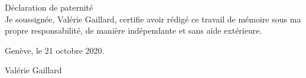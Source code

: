 
\begin{titlepage}
 \begin{center}
    \Large
    Déclaration de paternité\\





 Je soussignée, Valérie Gaillard, certifie avoir rédigé ce travail de mémoire sous ma propre responsabilité, de manière indépendante et sans aide extérieure.




 \vfill

 Genève, le 21 octobre 2020.


 Valérie Gaillard




	 \hfill \\
	 \rule{0mm}{0.5pt} \hfill
 \end{center}
\end{titlepage}
